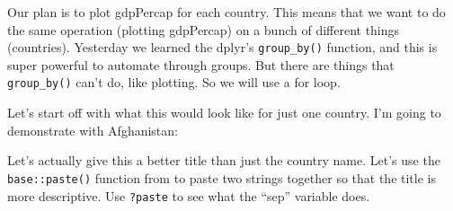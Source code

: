 \documentclass[]{book}
\newenvironment{Shaded}{\begin{snugshade}}{\end{snugshade}}
\newcommand{\KeywordTok}[1]{\textcolor[rgb]{0.13,0.29,0.53}{\textbf{#1}}}
\newcommand{\DataTypeTok}[1]{\textcolor[rgb]{0.13,0.29,0.53}{#1}}
\newcommand{\StringTok}[1]{\textcolor[rgb]{0.31,0.60,0.02}{#1}}
\newcommand{\OperatorTok}[1]{\textcolor[rgb]{0.81,0.36,0.00}{\textbf{#1}}}
\newcommand{\NormalTok}[1]{#1}
\theoremstyle{definition}
\theoremstyle{definition}
\theoremstyle{definition}
\theoremstyle{remark}
\begin{document}
Our plan is to plot gdpPercap for each country. This means that we want
to do the same operation (plotting gdpPercap) on a bunch of different
things (countries). Yesterday we learned the dplyr's
\texttt{group\_by()} function, and this is super powerful to automate
through groups. But there are things that \texttt{group\_by()} can't do,
like plotting. So we will use a for loop.

Let's start off with what this would look like for just one country. I'm
going to demonstrate with Afghanistan:

\begin{Shaded}
\end{Shaded}

Let's actually give this a better title than just the country name.
Let's use the \texttt{base::paste()} function from to paste two strings
together so that the title is more descriptive. Use \texttt{?paste} to
see what the ``sep'' variable does.

\begin{Shaded}
\end{Shaded}
\end{document}
